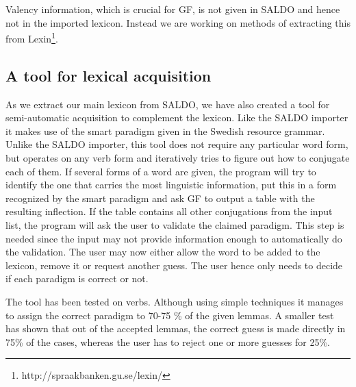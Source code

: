 \documentclass[10pt, a4paper]{article}
\begin{document}
Valency information, which is crucial for GF, is not given in SALDO and
hence not in the imported lexicon. Instead we are working on methods
of extracting this from
Lexin\footnote{http://spraakbanken.gu.se/lexin/}.


\subsection{A tool for lexical acquisition}
As we extract our main lexicon from SALDO, we have also created a tool for
semi-automatic acquisition to complement the lexicon.
Like the SALDO importer it makes use of
the smart paradigm given in the Swedish resource grammar.
Unlike the SALDO importer, this tool does not require any particular
word form, but operates on any verb form and 
iteratively tries to figure out how to conjugate each of them. If several forms
of a word are 
given, the program will try to identify the one that carries the most linguistic
information, put this in a form recognized by the smart paradigm and ask GF to output
a table with the resulting inflection. 
If the table contains all other conjugations from the input list,
the program will ask the  user to
validate the claimed paradigm. 
This step is needed since the input may not provide information enough
to automatically do the validation. The user may now either
allow the word to be added to the lexicon, remove it or request another guess.
The user hence only needs to decide if each paradigm is correct or not.

The tool has been tested on verbs. Although using simple techniques it 
manages to assign the correct paradigm to 70-75 \% of the given lemmas.
A smaller test has shown that out of the accepted lemmas, the correct guess is
made directly in 75\% of the cases, whereas the user has to reject one or more
guesses for 25\%. 


\end{document}
